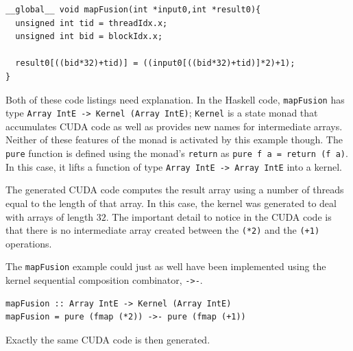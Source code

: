 \documentclass[]{sigplanconf}
\begin{document}
\begin{codesize} 
\begin{verbatim}
__global__ void mapFusion(int *input0,int *result0){
  unsigned int tid = threadIdx.x;
  unsigned int bid = blockIdx.x;
  
  result0[((bid*32)+tid)] = ((input0[((bid*32)+tid)]*2)+1);
}
\end{verbatim}
\end{codesize}
Both of these code listings need explanation. In the Haskell 
code, {\tt mapFusion} has type {\tt Array IntE -> Kernel (Array IntE)};
{\tt Kernel} is a state monad that accumulates CUDA code as well as provides 
new names for intermediate arrays. Neither of these features of the monad 
is activated by this example though. The {\tt pure} function is defined 
using the monad's {\tt return} as {\tt pure f a = return (f a)}. In this case, 
it lifts a function of type {\tt Array IntE -> Array IntE} into 
a kernel. 

The generated CUDA code computes the result array using a number of threads 
equal to the length of that array. In this case, the kernel was generated
to deal with arrays of length $32$. The important detail to notice in the 
CUDA code is that there is no intermediate array created between the 
{\tt (*2)} and the {\tt (+1)} operations. 

The {\tt mapFusion} example could just as well have been implemented using 
the kernel sequential composition combinator, {\tt ->-}. 
\begin{codesize} 
\begin{verbatim}
mapFusion :: Array IntE -> Kernel (Array IntE) 
mapFusion = pure (fmap (*2)) ->- pure (fmap (+1)) 
\end{verbatim}
\end{codesize}
Exactly the same CUDA code is then generated.
\end{document}
